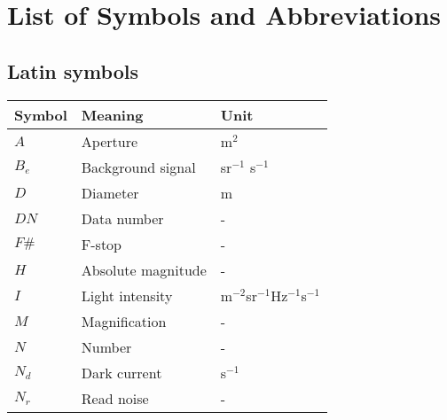 \cleardoublepage
{}
\listoffigures

\listoftables
{}
\newpage
\chapter{List of Symbols and Abbreviations}
\section*{Latin symbols}
\begin{table}[h!]
\begin{tabular}{lll}
\textbf{Symbol} & \textbf{Meaning}                  & \textbf{Unit}                                                            \\ \hline
$A$               & Aperture                          & m$^2$                                                     \\
$B_e$            & Background signal                 & sr$^{-1}$ s$^{-1}$                             \\
$D$               & Diameter                          & m                                                                        \\
$DN$              & Data number                       & -                                                                        \\
$F\#$             & F-stop                            & -                                                                        \\
$H$               & Absolute magnitude                & -                                                                        \\
$I$               & Light intensity                   & m$^{-2}$sr$^{-1}$Hz$^{-1}$s$^{-1}$ \\
$M$               & Magnification                     & -                                                                        \\
$N$               & Number                            & -                                                                        \\
$N_d$            & Dark current                      & s$^{-1}$                                                    \\
$N_r$            & Read noise                        & -                                                                        \\

\end{tabular}
\end{table}
